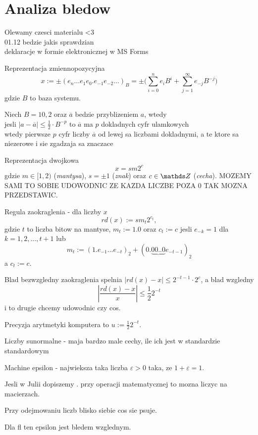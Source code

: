 \section{Analiza bledow}

Olewamy czesci materialu <3\\
01.12 bedzie jakis sprawdzian\\
deklaracje w formie elektronicznej w MS Forms
\bigskip

\begin{multicols}{2}

    {\color{def}Reprezentacja zmiennopozycyjna}
    $$x:=\pm(e_n...e_1e_0.e_{-1}e_{-2}...)_B = \pm\Big( \sum\limits_{i=0}^ne_iB^i+\sum\limits_{j=1}^\infty e_{-j}B^{-j} \Big)$$
    gdzie $B$ to baza systemu.
    \medskip

    Niech $B=10, 2$ oraz $\overline a$ bedzie przyblizeniem $a$, wtedy\smallskip\\
        \point jesli $|a-\overline{a}|\leq \frac12\cdot B^{-p}$ to $\overline a$ ma $p$ {\color{acc}dokladnych cyfr} ulamkowych\smallskip\\
        \point wtedy pierwsze $p$ cyfr liczby $\overline a$ od lewej sa liczbami dokladnymi, a te ktore sa niezerowe i sie zgadzaja sa {\color{acc}znaczace}
    \bigskip

    \bigskip

    {\color{def}Reprezentacja dwojkowa}
    $$x=sm2^c$$
    gdzie $m\in [1, 2)$ (\emph{mantysa}), $s=\pm 1$ (\emph{znak}) oraz $c\in\Z$ (\emph{cecha}). {\color{cyan}MOZEMY SAMI TO SOBIE UDOWODNIC ZE KAZDA LICZBE POZA 0 TAK MOZNA PRZEDSTAWIC}.
    \medskip

    {\color{def}Regula zaokraglenia} - dla liczby $x$
    $$rd(x):=sm_t 2^{c_t},$$
    gdzie $t$ to liczba bitow na mantyse, $m_t:=1.0$ oraz $c_t:=c$ jesli $e_{-k}=1$ dla $k=1, 2, ..., t+1$ lub
    $$m_t:= (1.e_{-1}...e_{-t})_2+(0.\underbrace{00..0}e_{-t-1})_2$$
    a $c_t:=c$.
    \bigskip

    Blad bezwzgledny zaokraglenia spelnia $|rd(x)-x|\leq 2^{-t-1}\cdot 2^c$, a blad wzgledny 
    $$|\frac{rd(x)-x}x|\leq \frac122^{-t}$$
    {\color{cyan}i to drugie chcemy udowodnic czy cos}.
    \medskip

    {\color{def}Precyzja arytmetyki} komputera to $u:=\frac122^{-t}$.

    {\color{def}Liczby sunormalne} - maja bardzo male cechy, {\color{cyan}ile ich jest w standardzie standardowym}

    {\color{acc}Machine epsilon} - najwieksza taka liczba $\varepsilon>0$ taka, ze $1+\varepsilon=1$.
    \bigskip

    Jesli w Julii dopiszemy . przy operacji matematycznej to mozna liczyc na macierzach.
    \bigskip

    Przy odejmowaniu liczb blisko siebie cos sie psuje.

    Dla fl ten epsilon jest bledem wzglednym.

\end{multicols}